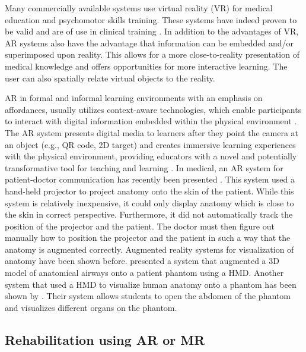 Many commercially available systems use virtual reality (VR) for medical education and psychomotor skills training. These systems have indeed proven to be valid and are of use in clinical training \cite{Lewis2011,Thijssen2010,VanDongen2011}. In addition to the advantages of VR, AR systems also have the advantage that information can be embedded and/or superimposed upon reality. This allows for a more close-to-reality presentation of medical knowledge and offers opportunities for more interactive learning. The user can also spatially relate virtual objects to the reality. 

AR in formal and informal learning environments with an emphasis on affordances, usually utilizes context-aware technologies, which enable participants to interact with digital information embedded within the physical environment \cite{Dunleavy2008}. The AR system presents digital media to learners after they point the camera at an object (e.g., QR code, 2D target) and creates immersive learning experiences with the physical environment, providing educators with a novel and potentially transformative tool for teaching and learning \cite{Dede2009,Johnson2011}. In medical, an AR system for patient-doctor communication has recently been presented \cite{Ni2011}. This system used a hand-held projector to project anatomy onto the skin of the patient. While this system is relatively inexpensive, it could only display anatomy which is close to the skin in correct perspective. Furthermore, it did not automatically track the position of the projector and the patient. The doctor must then figure out manually how to position the projector and the patient in such a way that the anatomy is augmented correctly.
Augmented reality systems for visualization of anatomy have been shown before. \cite{Davis2002} presented a system that augmented a 3D model of anatomical airways onto a patient phantom using a HMD. Another system that used a HMD to visualize human anatomy onto a phantom has been shown by \cite{Juan2008}. Their system allows students to open the abdomen of the phantom and visualizes different organs on the phantom.
\subsection{Rehabilitation using AR or MR}

